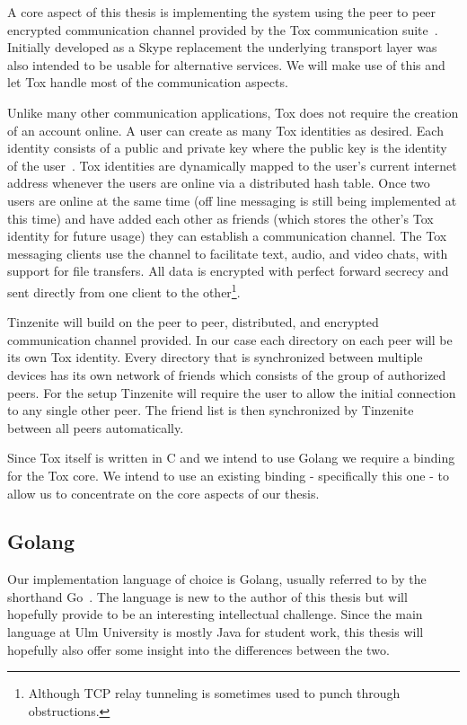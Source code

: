 A core aspect of this thesis is implementing the system using the peer to peer encrypted communication channel provided by the Tox communication suite~\cite{web:site:tox}.
Initially developed as a Skype replacement the underlying transport layer was also intended to be usable for alternative services.
We will make use of this and let Tox handle most of the communication aspects.

Unlike many other communication applications, Tox does not require the creation of an account online.
A user can create as many Tox identities as desired.
Each identity consists of a public and private key where the public key is the identity of the user~\cite{web:site:tox:crypto}.
Tox identities are dynamically mapped to the user's current internet address whenever the users are online via a distributed hash table.
Once two users are online at the same time (off line messaging is still being implemented at this time) and have added each other as friends (which stores the other's Tox identity for future usage) they can establish a communication channel.
The Tox messaging clients use the channel to facilitate text, audio, and video chats, with support for file transfers.
All data is encrypted with perfect forward secrecy and sent directly from one client to the other\footnote{Although TCP relay tunneling is sometimes used to punch through obstructions.}.

Tinzenite will build on the peer to peer, distributed, and encrypted communication channel provided.
In our case each directory on each peer will be its own Tox identity.
Every directory that is synchronized between multiple devices has its own network of friends which consists of the group of authorized peers.
For the setup Tinzenite will require the user to allow the initial connection to any single other peer.
The friend list is then synchronized by Tinzenite between all peers automatically.

Since Tox itself is written in C and we intend to use Golang we require a binding for the Tox core.
We intend to use an existing binding - specifically this one \cite{web:site:tox:golang} - to allow us to concentrate on the core aspects of our thesis.

\subsection{Golang}

Our implementation language of choice is Golang, usually referred to by the shorthand Go~\cite{web:site:golang}.
The language is new to the author of this thesis but will hopefully provide to be an interesting intellectual challenge.
Since the main language at Ulm University is mostly Java for student work, this thesis will hopefully also offer some insight into the differences between the two.

